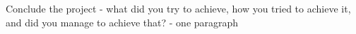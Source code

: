 Conclude the project - what did you try to achieve, how you tried to achieve it, and did you manage to achieve that?  - one paragraph